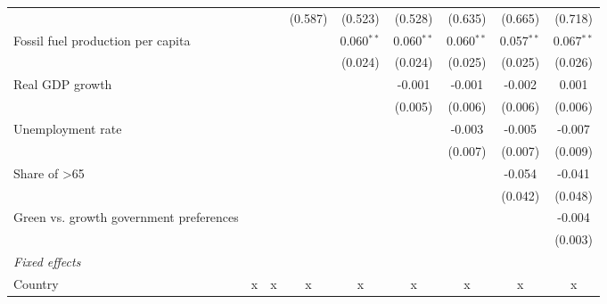 \begin{table}[htbp]
\begin{tabular}{lcccccccc}
                                                                &               &         & (0.587) & (0.523)      & (0.528)      & (0.635)      & (0.665)      & (0.718)\\   
      Fossil fuel production per capita                         &               &         &         & 0.060$^{**}$ & 0.060$^{**}$ & 0.060$^{**}$ & 0.057$^{**}$ & 0.067$^{**}$\\   
                                                                &               &         &         & (0.024)      & (0.024)      & (0.025)      & (0.025)      & (0.026)\\   
      Real GDP growth                                           &               &         &         &              & -0.001       & -0.001       & -0.002       & 0.001\\   
                                                                &               &         &         &              & (0.005)      & (0.006)      & (0.006)      & (0.006)\\   
      Unemployment rate                                         &               &         &         &              &              & -0.003       & -0.005       & -0.007\\   
                                                                &               &         &         &              &              & (0.007)      & (0.007)      & (0.009)\\   
      Share of >65                                              &               &         &         &              &              &              & -0.054       & -0.041\\   
                                                                &               &         &         &              &              &              & (0.042)      & (0.048)\\   
      Green vs. growth government preferences                   &               &         &         &              &              &              &              & -0.004\\   
                                                                &               &         &         &              &              &              &              & (0.003)\\   
      \emph{Fixed effects}\\
      Country                                                   & x             & x       & x       & x            & x            & x            & x            & x\\  

\end{tabular}
\end{table}
